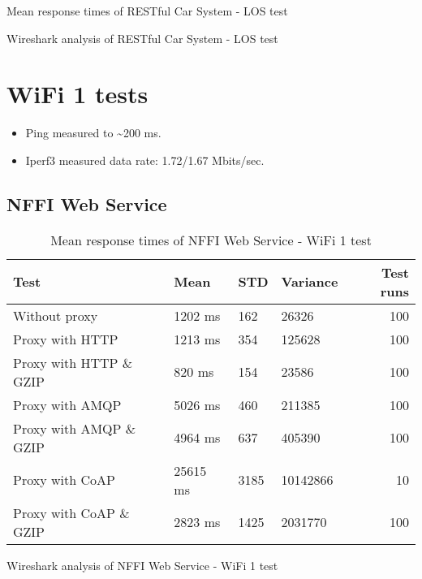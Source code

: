 \begin{appendices}
\begin{table}[H]

\caption{Mean response times of RESTful Car System - LOS test}
\end{table}

\begin{table}[H]

\caption{Wireshark analysis of RESTful Car System - LOS test}
\end{table}


\section{WiFi 1 tests}

\begin{itemize}
	\item Ping measured to \textasciitilde 200 ms.
	\item Iperf3 measured data rate: 1.72/1.67 Mbits/sec.
\end{itemize}


\subsection{NFFI Web Service}

\begin{table}[H]
\begin{tabular}{llllr}
\hline
 Test                   &   Mean &   STD &   Variance &   Test runs \\
\hline
  Without proxy & 1202 ms & 162 & 26326 & 100 \\
  Proxy with HTTP & 1213 ms & 354 & 125628 & 100 \\
  Proxy with HTTP \& GZIP & 820 ms & 154 & 23586 & 100 \\
  Proxy with AMQP & 5026 ms & 460 & 211385 & 100 \\
  Proxy with AMQP \& GZIP & 4964 ms & 637 & 405390 & 100\\
  Proxy with CoAP & 25615 ms & 3185 & 10142866 & 10 \\
  Proxy with CoAP \& GZIP & 2823 ms & 1425 & 2031770 & 100 \\
\end{tabular}
\caption{Mean response times of NFFI Web Service - WiFi 1 test}
\end{table}

\begin{table}[H]

\caption{Wireshark analysis of NFFI Web Service - WiFi 1 test}
\end{table}


\end{appendices}
